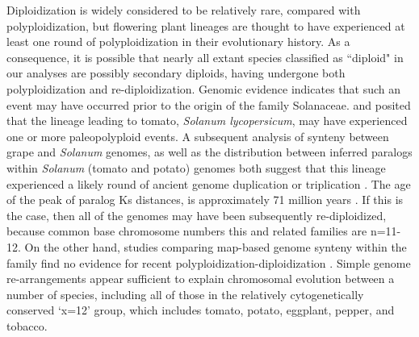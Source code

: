 Diploidization is widely considered to be relatively rare, compared with polyploidization, but flowering plant lineages are thought to have experienced at least one round of polyploidization in their evolutionary history.
As a consequence, it is possible that nearly all extant species classified as ``diploid" in our analyses are possibly secondary diploids, having undergone both polyploidization and re-diploidization.
Genomic evidence indicates that such an event may have occurred prior to the origin of the family Solanaceae. 
\citet{ku2000} and \citet{blanc2004} posited that the lineage leading to tomato, \textit{Solanum lycopersicum}, may have experienced one or more paleopolyploid events.
A subsequent analysis of synteny between grape and \textit{Solanum} genomes, as well as the distribution between inferred paralogs within \textit{Solanum} (tomato and potato) genomes both suggest that this lineage experienced a likely round of ancient genome duplication or triplication \citep{tomato2012}. 
The age of the peak of paralog Ks distances, is approximately 71 million years \citep{tomato2012}. 
If this is the case, then all of the genomes may have been subsequently re-diploidized, because common base chromosome numbers this and related families are n=11-12. 
On the other hand, studies comparing map-based genome synteny within the family find no evidence for recent polyploidization-diploidization \citep{wu_2010a}. 
Simple genome re-arrangements appear sufficient to explain chromosomal evolution between a number of species, including all of those in the relatively cytogenetically conserved `x=12' group, which includes tomato, potato, eggplant, pepper, and tobacco.



%
